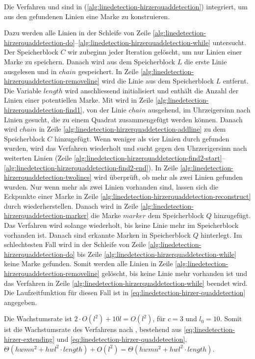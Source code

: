 Die Verfahren  und  sind in 
 (\autoref{alg:linedetection-hirzerquaddetection}) integriert, um aus den gefundenen Linien eine Marke zu konstruieren.

Dazu werden alle Linien in der Schleife von Zeile
 \ref{alg:linedetection-hirzerquaddetection-do}--\ref{alg:linedetection-hirzerquaddetection-while} untersucht. Der
 Speicherblock $C$ wir zubeginn jeder Iteration gelöscht, um nur Linien einer Marke zu speichern. Danach wird aus dem
 Speicherblock $L$ die erste Linie ausgelesen und in $\mathit{chain}$ gespeichert. In Zeile
 \ref{alg:linedetection-hirzerquaddetection-removeline} wird die Linie aus dem Speicherblock $L$ entfernt. Die Variable
 $\mathit{length}$ wird anschliessend initialisiert und enthält die Anzahl der Linien einer potentiellen Marke. Mit
  wird in Zeile \ref{alg:linedetection-hirzerquaddetection-find1}, von der Linie
 $\mathit{chain}$ ausgehend, im Uhrzeigersinn nach Linien gesucht, die zu einem Quadrat zusammengefügt werden können.
 Danach wird $\mathit{chain}$ in Zeile \ref{alg:linedetection-hirzerquaddetection-addline} zu dem Speicherblock $C$
 hinzugefügt. Wenn weniger als vier Linien durch  gefunden wurden, wird das Verfahren
 wiederholt und sucht gegen den Uhrzerigersinn nach weiterten Linien (Zeile
 \ref{alg:linedetection-hirzerquaddetection-find2-start}--\ref{alg:linedetection-hirzerquaddetection-find2-end}). In
 Zeile \ref{alg:linedetection-hirzerquaddetection-twolines} wird überprüft, ob mehr als zwei Linien gefunden wurden.
 Nur wenn mehr als zwei Linien vorhanden sind, lassen sich die Eckpunkte einer Marke in Zeile
 \ref{alg:linedetection-hirzerquaddetection-reconstruct} durch  wiederherstellen. Danach
 wird in Zeile \ref{alg:linedetection-hirzerquaddetection-marker} die Marke $\mathit{marker}$ dem Speicherblock $Q$
 hinzugefügt. Das Verfahren wird solange wiederholt, bis keine Linie mehr im Speicherblock vorhanden ist. Danach sind
 erkannte Marken in Speicherblock $Q$ hinterlegt. Im schlechtesten Fall wird in der Schleife von Zeile
 \ref{alg:linedetection-hirzerquaddetection-do} bis Zeile \ref{alg:linedetection-hirzerquaddetection-while} keine Marke
 gefunden. Somit werden alle Linien in Zeile \ref{alg:linedetection-hirzerquaddetection-removeline} gelöscht, bis keine
 Linie mehr vorhanden ist und das Verfahren in Zeile \ref{alg:linedetection-hirzerquaddetection-while} beendet wird.
 Die Laufzeitfunktion für diesen Fall ist in \autoref{eq:linedetection-hirzer-quaddetection} angegeben.

Die Wachstumsrate ist $2 \cdot O(l^2) + 10l = O(l^2)$, für $c = 3$ und $l_{0} = 10$. Somit ist die Wachstumsrate des
 Verfahrens nach \citeauthor{hirzer08}, bestehend aus \autoref{eq:linedetection-hirzer-extending} und
 \autoref{eq:linedetection-hirzer-quaddetection},
 $\Theta(hwmn^2 + hwl^2\cdot\mathit{length}) + O(l^2) = \Theta(hwmn^2 + hwl^2\cdot\mathit{length})$.
